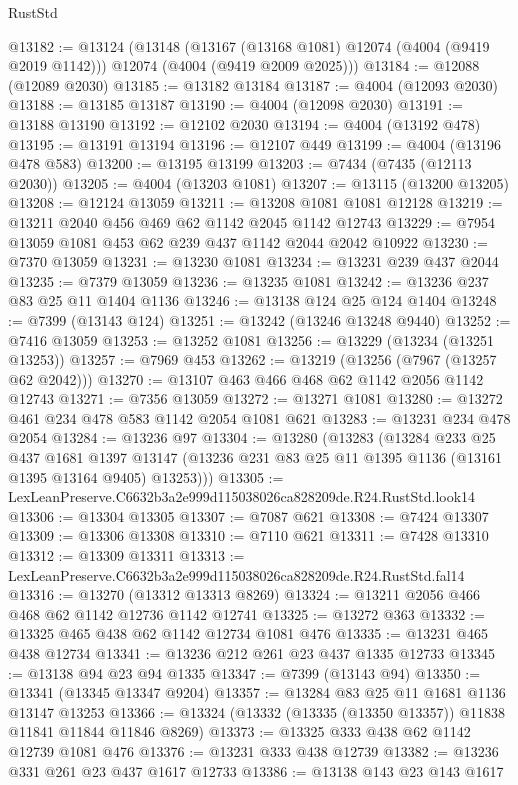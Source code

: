 \begin{lexlean}{RustStd}
\begin{coremodule}
@13182 := @13124
    (@13148
      (@13167 (@13168 @1081) @12074 (@4004 (@9419 @2019 @1142)))
      @12074
      (@4004 (@9419 @2009 @2025)))
@13184 := @12088 (@12089 @2030)
@13185 := @13182 @13184
@13187 := @4004 (@12093 @2030)
@13188 := @13185 @13187
@13190 := @4004 (@12098 @2030)
@13191 := @13188 @13190
@13192 := @12102 @2030
@13194 := @4004 (@13192 @478)
@13195 := @13191 @13194
@13196 := @12107 @449
@13199 := @4004 (@13196 @478 @583)
@13200 := @13195 @13199
@13203 := @7434 (@7435 (@12113 @2030))
@13205 := @4004 (@13203 @1081)
@13207 := @13115 (@13200 @13205)
@13208 := @12124 @13059
@13211 := @13208 @1081 @1081 @12128
@13219 := @13211 @2040 @456 @469 @62 @1142 @2045 @1142 @12743
@13229 := @7954 @13059 @1081 @453 @62 @239 @437 @1142 @2044 @2042 @10922
@13230 := @7370 @13059
@13231 := @13230 @1081
@13234 := @13231 @239 @437 @2044
@13235 := @7379 @13059
@13236 := @13235 @1081
@13242 := @13236 @237 @83 @25 @11 @1404 @1136
@13246 := @13138 @124 @25 @124 @1404
@13248 := @7399 (@13143 @124)
@13251 := @13242 (@13246 @13248 @9440)
@13252 := @7416 @13059
@13253 := @13252 @1081
@13256 := @13229 (@13234 (@13251 @13253))
@13257 := @7969 @453
@13262 := @13219 (@13256 (@7967 (@13257 @62 @2042)))
@13270 := @13107 @463 @466 @468 @62 @1142 @2056 @1142 @12743
@13271 := @7356 @13059
@13272 := @13271 @1081
@13280 := @13272 @461 @234 @478 @583 @1142 @2054 @1081 @621
@13283 := @13231 @234 @478 @2054
@13284 := @13236 @97
@13304 := @13280
    (@13283
      (@13284
        @233
        @25
        @437
        @1681
        @1397
        @13147
        (@13236 @231 @83 @25 @11 @1395 @1136 (@13161 @1395 @13164 @9405) @13253)))
@13305 := LexLeanPreserve.C6632b3a2e999d115038026ca828209de.R24.RustStd.look14
@13306 := @13304 @13305
@13307 := @7087 @621
@13308 := @7424 @13307
@13309 := @13306 @13308
@13310 := @7110 @621
@13311 := @7428 @13310
@13312 := @13309 @13311
@13313 := LexLeanPreserve.C6632b3a2e999d115038026ca828209de.R24.RustStd.fal14
@13316 := @13270 (@13312 @13313 @8269)
@13324 := @13211 @2056 @466 @468 @62 @1142 @12736 @1142 @12741
@13325 := @13272 @363
@13332 := @13325 @465 @438 @62 @1142 @12734 @1081 @476
@13335 := @13231 @465 @438 @12734
@13341 := @13236 @212 @261 @23 @437 @1335 @12733
@13345 := @13138 @94 @23 @94 @1335
@13347 := @7399 (@13143 @94)
@13350 := @13341 (@13345 @13347 @9204)
@13357 := @13284 @83 @25 @11 @1681 @1136 @13147 @13253
@13366 := @13324 (@13332 (@13335 (@13350 @13357)) @11838 @11841 @11844 @11846 @8269)
@13373 := @13325 @333 @438 @62 @1142 @12739 @1081 @476
@13376 := @13231 @333 @438 @12739
@13382 := @13236 @331 @261 @23 @437 @1617 @12733
@13386 := @13138 @143 @23 @143 @1617

\end{coremodule}
\end{lexlean}
